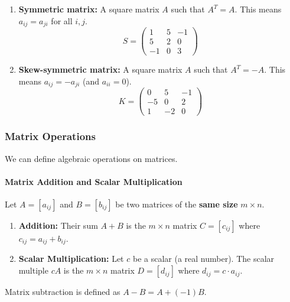 \documentclass[oneside]{book}
\begin{document}
\begin{enumerate}
    \item \textbf{Symmetric matrix:} A square matrix $A$ such that $A^T = A$. This means $a_{ij} = a_{ji}$ for all $i, j$.
    \[ S = \begin{pmatrix} 1 & 5 & -1 \\ 5 & 2 & 0 \\ -1 & 0 & 3 \end{pmatrix} \]
    \item \textbf{Skew-symmetric matrix:} A square matrix $A$ such that $A^T = -A$. This means $a_{ij} = -a_{ji}$ (and $a_{ii} = 0$).
    \[ K = \begin{pmatrix} 0 & 5 & -1 \\ -5 & 0 & 2 \\ 1 & -2 & 0 \end{pmatrix} \]
\end{enumerate}

\subsubsection{Matrix Operations}

We can define algebraic operations on matrices.

\paragraph{Matrix Addition and Scalar Multiplication}
\begin{definition}
Let $A = [a_{ij}]$ and $B = [b_{ij}]$ be two matrices of the \textbf{same size} $m \times n$.
\begin{enumerate}
    \item \textbf{Addition:} Their sum $A+B$ is the $m \times n$ matrix $C = [c_{ij}]$ where $c_{ij} = a_{ij} + b_{ij}$.
    \item \textbf{Scalar Multiplication:} Let $c$ be a scalar (a real number). The scalar multiple $cA$ is the $m \times n$ matrix $D = [d_{ij}]$ where $d_{ij} = c \cdot a_{ij}$.
\end{enumerate}
Matrix subtraction is defined as $A - B = A + (-1)B$.
\end{definition}
\end{document}
